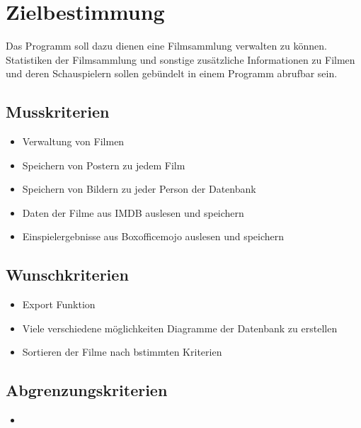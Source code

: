 \section{Zielbestimmung}
Das Programm soll dazu dienen eine Filmsammlung verwalten zu können. Statistiken der Filmsammlung und sonstige zusätzliche Informationen zu Filmen und deren Schauspielern sollen gebündelt in einem Programm abrufbar sein.

\subsection{Musskriterien}
\begin{itemize}
	\item Verwaltung von Filmen
	\item Speichern von Postern zu jedem Film
	\item Speichern von Bildern zu jeder Person der Datenbank
	\item Daten der Filme aus IMDB auslesen und speichern
	\item Einspielergebnisse aus Boxofficemojo auslesen und speichern
\end{itemize}

\subsection{Wunschkriterien}
\begin{itemize}
	\item Export Funktion
	\item Viele verschiedene möglichkeiten Diagramme der Datenbank zu erstellen
	\item Sortieren der Filme nach bstimmten Kriterien
\end{itemize}

\subsection{Abgrenzungskriterien}
\begin{itemize}
	\item 
\end{itemize}
